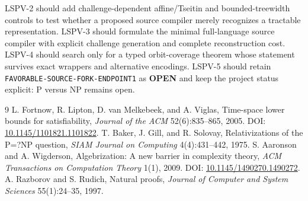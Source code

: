 \documentclass[11pt]{article}
\begin{document}
LSPV-2 should add challenge-dependent affine/Tseitin and bounded-treewidth
controls to test whether a proposed source compiler merely recognizes a
tractable representation.  LSPV-3 should formulate the minimal
full-language source compiler with explicit challenge generation and
complete reconstruction cost.  LSPV-4 should search only for a typed
orbit-coverage theorem whose statement survives exact wrappers and
alternative encodings.  LSPV-5 should retain
\texttt{FAVORABLE-SOURCE-FORK-ENDPOINT1} as \textbf{OPEN} and keep the
project status explicit: P versus NP remains open.

\begin{thebibliography}{9}
L. Fortnow, R. Lipton, D. van Melkebeek, and A. Viglas,
Time-space lower bounds for satisfiability,
\emph{Journal of the ACM} 52(6):835--865, 2005.
DOI: \href{https://doi.org/10.1145/1101821.1101822}{10.1145/1101821.1101822}.
T. Baker, J. Gill, and R. Solovay,
Relativizations of the P=?NP question,
\emph{SIAM Journal on Computing} 4(4):431--442, 1975.
S. Aaronson and A. Wigderson,
Algebrization: A new barrier in complexity theory,
\emph{ACM Transactions on Computation Theory} 1(1), 2009.
DOI: \href{https://doi.org/10.1145/1490270.1490272}{10.1145/1490270.1490272}.
A. Razborov and S. Rudich,
Natural proofs,
\emph{Journal of Computer and System Sciences} 55(1):24--35, 1997.
\end{thebibliography}
\end{document}
